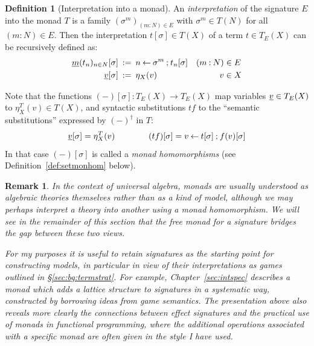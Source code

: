 \documentclass[11pt,oneside,draft]{book}
\newtheorem{remark}[theorem]{Remark}
\theoremstyle{definition}
\newtheorem{definition}[theorem]{Definition}
\newcommand{\ul}[1]{%
  \underline{\smash{#1}}
}
\begin{document}
\begin{definition}[Interpretation into a monad] \label{def:monadint}
An \emph{interpretation} of the signature $E$ into the monad $T$
is a family $(\sigma^m)_{(m \mathbin: N) \in E}$
with $\sigma^m \in T(N)$ for all $(m \mathbin: N) \in E$.
Then the interpretation $t[\sigma] \in T(X)$
of a term $t \in T_E(X)$
can be recursively defined as:
\begin{align*}
  \ul{m}(t_n)_{n \in N}[\sigma] \: &:= \:
    n \mathbin\leftarrow \sigma^m \mathbin; t_n[\sigma]
    & (m \mathbin: N) &\in E
  \\
  \ul{v}[\sigma] \: &:= \: \eta_X(v)
    & v &\in X
\end{align*}
\end{definition}

Note that the functions
$(-)[\sigma] : T_E(X) \rightarrow T_E(X)$
map variables $\ul{v} \in T_E(X)$ to $\eta^T_X(v) \in T(X)$,
and syntactic substitutions $t f$
to the ``semantic substitutions'' expressed by $(-)^\dagger$ in $T$:
\begin{equation} \label{eqn:substint}
  \ul{v}[\sigma] = \eta^T_X(v)
  \qquad \qquad
  (t f)[\sigma] = v \mathbin\leftarrow t[\sigma] \mathbin; f(v)[\sigma]
\end{equation}
In that case $(-)[\sigma]$ is called a
\emph{monad homomorphisms} (see Definition~\ref{def:setmonhom} below).

\begin{remark} %
In the context of universal algebra,
monads are usually understood
as algebraic theories themselves
rather than as a kind of model,
although we may perhaps interpret a theory
into another using a monad homomorphism.
We will see in the remainder of this section that
the \emph{free monad} for a signature
bridges the gap between these two views.

For my purposes it is useful to retain signatures
as the starting point for constructing models,
in particular in view of their interpretations as games
outlined in \S\ref{sec:bg:termstrat}.
For example,
Chapter~\ref{sec:intspec}
describes a monad which adds
a lattice structure to signatures in a systematic way,
constructed by borrowing ideas from game semantics.
The presentation above also
reveals more clearly the connections between effect signatures
and the practical use of monads in functional programming,
where the additional operations associated with a specific monad
are often given in the style I have used.
\end{remark}
\end{document}
